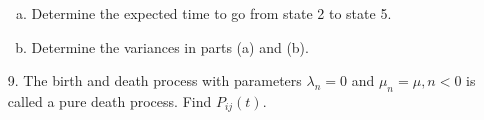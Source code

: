 \documentclass{article}
\begin{document}
\begin{itemize}
\begin{enumerate}[(a)]
			\item Determine the expected time to go from state 2 to state 5.

			\item Determine the variances in parts (a) and (b).
				
		\end{enumerate}

	\item[9.] The birth and death process with parameters $\lambda_n=0$ and $\mu_n=\mu, n<0$ is called a pure death process. Find $P_{ij}(t).$
		
\end{itemize}
\end{document}
